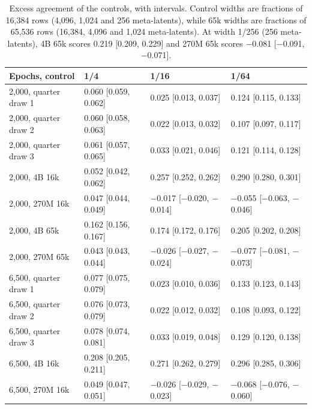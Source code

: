 \begin{table}[!ht]
  \caption{Excess agreement of the controls, with intervals. Control widths are fractions of 16,384 rows (4,096, 1,024 and 256 meta-latents), while 65k widths are fractions of 65,536 rows (16,384, 4,096 and 1,024 meta-latents). At width 1/256 (256 meta-latents), 4B 65k scores 0.219 [0.209, 0.229] and 270M 65k scores $-$0.081 [$-$0.091, $-$0.071].}
  \label{tab:app-arms}
  \centering
  \small
  \begin{tabular}{@{}llll@{}}
    \toprule
    Epochs, control & 1/4 & 1/16 & 1/64 \\
    \midrule
    2,000, quarter draw 1 & 0.060 [0.059, 0.062] & 0.025 [0.013, 0.037] & 0.124 [0.115, 0.133] \\
    2,000, quarter draw 2 & 0.060 [0.058, 0.063] & 0.022 [0.013, 0.032] & 0.107 [0.097, 0.117] \\
    2,000, quarter draw 3 & 0.061 [0.057, 0.065] & 0.033 [0.021, 0.046] & 0.121 [0.114, 0.128] \\
    2,000, 4B 16k & 0.052 [0.042, 0.062] & 0.257 [0.252, 0.262] & 0.290 [0.280, 0.301] \\
    2,000, 270M 16k & 0.047 [0.044, 0.049] & $-$0.017 [$-$0.020, $-$0.014] & $-$0.055 [$-$0.063, $-$0.046] \\
    2,000, 4B 65k & 0.162 [0.156, 0.167] & 0.174 [0.172, 0.176] & 0.205 [0.202, 0.208] \\
    2,000, 270M 65k & 0.043 [0.043, 0.044] & $-$0.026 [$-$0.027, $-$0.024] & $-$0.077 [$-$0.081, $-$0.073] \\
    \midrule
    6,500, quarter draw 1 & 0.077 [0.075, 0.079] & 0.023 [0.010, 0.036] & 0.133 [0.123, 0.143] \\
    6,500, quarter draw 2 & 0.076 [0.073, 0.079] & 0.022 [0.012, 0.032] & 0.108 [0.093, 0.122] \\
    6,500, quarter draw 3 & 0.078 [0.074, 0.081] & 0.033 [0.019, 0.048] & 0.129 [0.120, 0.138] \\
    6,500, 4B 16k & 0.208 [0.205, 0.211] & 0.271 [0.262, 0.279] & 0.296 [0.285, 0.306] \\
    6,500, 270M 16k & 0.049 [0.047, 0.051] & $-$0.026 [$-$0.029, $-$0.023] & $-$0.068 [$-$0.076, $-$0.060] \\
    \bottomrule
  \end{tabular}
\end{table}

